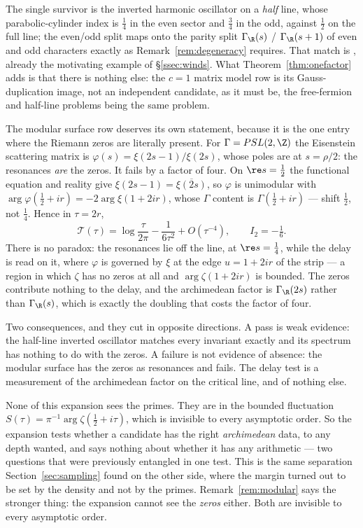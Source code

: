 The single survivor is the inverted harmonic oscillator on a \emph{half} line,
whose parabolic-cylinder index is $\frac14$ in the even sector and $\frac34$ in
the odd, against $\frac12$ on the full line; the even/odd split maps onto the
parity split $\Gamma_\R(s)$ / $\Gamma_\R(s+1)$ of even and odd characters exactly
as Remark~\ref{rem:degeneracy} requires. That match is \cite{BhaduriKhareLaw},
already the motivating example of \S\ref{ssec:winds}. What
Theorem~\ref{thm:onefactor} adds is that there is nothing else: the $c=1$ matrix
model row is its Gauss-duplication image, not an independent candidate, as it
must be, the free-fermion and half-line problems being the same problem.

\begin{remark}\label{rem:modular}
The modular surface row deserves its own statement, because it is the one entry
where the Riemann zeros are literally present. For $\Gamma=PSL(2,\Z)$ the
Eisenstein scattering matrix \cite{Iwaniec} is $\varphi(s)=\xi(2s-1)/\xi(2s)$, whose poles are at
$s=\rho/2$: the resonances \emph{are} the zeros. It fails by a factor of four. On
$\re s=\frac12$ the functional equation and reality give
$\xi(2s-1)=\overline{\xi(2s)}$, so $\varphi$ is unimodular with
$\arg\varphi(\frac12+ir)=-2\arg\xi(1+2ir)$, whose $\Gamma$ content is
$\Gamma(\frac12+ir)$ --- shift $\frac12$, not $\frac14$. Hence in $\tau=2r$,
\[
 \mathcal T(\tau)=\log\frac\tau{2\pi}-\frac1{6\tau^2}+O(\tau^{-4}),\qquad
 I_2=-\tfrac16 .
\]
There is no paradox: the resonances lie off the line, at $\re s=\frac14$, while
the delay is read on it, where $\varphi$ is governed by $\xi$ at the edge
$u=1+2ir$ of the strip --- a region in which $\zeta$ has no zeros at all and
$\arg\zeta(1+2ir)$ is bounded. The zeros contribute nothing to the delay, and the
archimedean factor is $\Gamma_\R(2s)$ rather than $\Gamma_\R(s)$, which is exactly
the doubling that costs the factor of four.

Two consequences, and they cut in opposite directions. A pass is weak evidence:
the half-line inverted oscillator matches every invariant exactly and its spectrum
has nothing to do with the zeros. A failure is not evidence of absence: the
modular surface has the zeros as resonances and fails. The delay test is a
measurement of the archimedean factor on the critical line, and of nothing else.
\end{remark}

\begin{remark}\label{rem:notprimes}
None of this expansion sees the primes. They are in the bounded fluctuation
$S(\tau)=\pi^{-1}\arg\zeta(\frac12+i\tau)$, which is invisible to every
asymptotic order. So the expansion tests whether a candidate has the right
\emph{archimedean} data, to any depth wanted, and says nothing about whether it
has any arithmetic --- two questions that were previously entangled in one test.
This is the same separation Section~\ref{sec:sampling} found on the other side,
where the margin turned out to be set by the density and not by the primes.
Remark~\ref{rem:modular} says the stronger thing: the expansion cannot see the
\emph{zeros} either. Both are invisible to every asymptotic order.
\end{remark}

